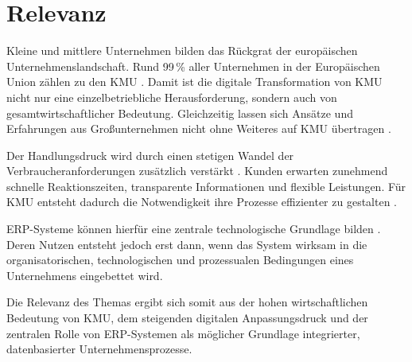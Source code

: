 \section{Relevanz}

Kleine und mittlere Unternehmen bilden das Rückgrat der europäischen
Unternehmenslandschaft. Rund 99\,\% aller Unternehmen in der Europäischen
Union zählen zu den KMU \parencite{Alaskari2021,Leyh2015}. Damit ist die
digitale Transformation von KMU nicht nur eine einzelbetriebliche
Herausforderung, sondern auch von gesamtwirtschaftlicher Bedeutung.
Gleichzeitig lassen sich Ansätze und Erfahrungen aus Großunternehmen nicht
ohne Weiteres auf KMU übertragen
\parencite{Xia2009,Leyh2015}. 

Der Handlungsdruck wird durch einen stetigen Wandel der
Verbraucheranforderungen zusätzlich verstärkt \parencite{Alaskari2021}.
Kunden erwarten zunehmend schnelle Reaktionszeiten, transparente Informationen
und flexible Leistungen. 
Für KMU entsteht dadurch die Notwendigkeit ihre Prozesse effizienter zu gestalten \parencite{Leyh2017}.

ERP-Systeme können hierfür eine zentrale technologische Grundlage bilden \parencite{Leyh2017}. 
Deren Nutzen entsteht jedoch
erst dann, wenn das System wirksam in die organisatorischen,
technologischen und prozessualen Bedingungen eines Unternehmens eingebettet
wird.

Die Relevanz des Themas ergibt sich somit aus der hohen wirtschaftlichen
Bedeutung von KMU, dem steigenden digitalen Anpassungsdruck und der zentralen
Rolle von ERP-Systemen als möglicher Grundlage integrierter, datenbasierter
Unternehmensprozesse.